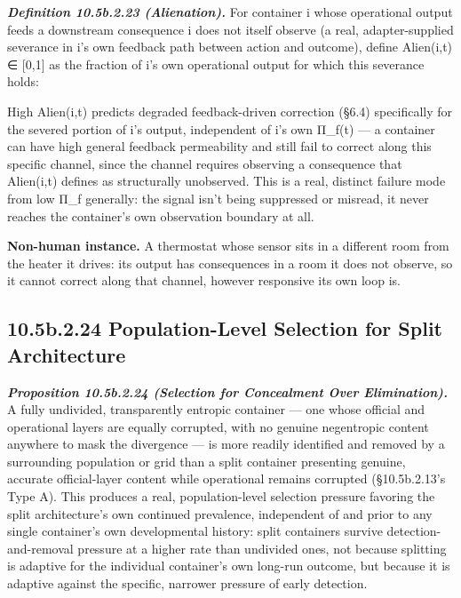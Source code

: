 \documentclass[
]{article}
\begin{document}
\emph{\textbf{Definition 10.5b.2.23 (Alienation).}} For container i
whose operational output feeds a downstream consequence i does not
itself observe (a real, adapter-supplied severance in i's own feedback
path between action and outcome), define Alien(i,t) ∈ {[}0,1{]} as the
fraction of i's own operational output for which this severance holds:

High Alien(i,t) predicts degraded feedback-driven correction (§6.4)
specifically for the severed portion of i's output, independent of i's
own Π\_f(t) --- a container can have high general feedback permeability
and still fail to correct along this specific channel, since the channel
requires observing a consequence that Alien(i,t) defines as structurally
unobserved. This is a real, distinct failure mode from low Π\_f
generally: the signal isn't being suppressed or misread, it never
reaches the container's own observation boundary at all.

\textbf{Non-human instance.} A thermostat whose sensor sits in a
different room from the heater it drives: its output has consequences in
a room it does not observe, so it cannot correct along that channel,
however responsive its own loop is.

\hypertarget{b.2.24-population-level-selection-for-split-architecture}{%
\subsection{10.5b.2.24 Population-Level Selection for Split
Architecture}\label{b.2.24-population-level-selection-for-split-architecture}}

\emph{\textbf{Proposition 10.5b.2.24 (Selection for Concealment Over
Elimination).}} A fully undivided, transparently entropic container ---
one whose official and operational layers are equally corrupted, with no
genuine negentropic content anywhere to mask the divergence --- is more
readily identified and removed by a surrounding population or grid than
a split container presenting genuine, accurate official-layer content
while operational remains corrupted (§10.5b.2.13's Type A). This
produces a real, population-level selection pressure favoring the split
architecture's own continued prevalence, independent of and prior to any
single container's own developmental history: split containers survive
detection-and-removal pressure at a higher rate than undivided ones, not
because splitting is adaptive for the individual container's own
long-run outcome, but because it is adaptive against the specific,
narrower pressure of early detection.
\end{document}
